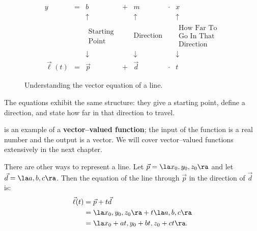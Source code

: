 \begin{figure}[!hb]
\begin{center}
\iflatexml
\[
\begin{array}{ccccccc}
y&=&b&+&m&\cdot&x \\
&&\uparrow&&\uparrow&&\uparrow \\
&&\begin{gathered}\text{Starting}\\[-1ex]\text{Point}\end{gathered}
&&\text{Direction}&&
\begin{gathered}
\text{How Far To}\\[-1ex]\text{Go In That}\\[-1ex]\text{Direction}
\end{gathered} \\
&&\downarrow&&\downarrow&&\downarrow \\
\vec\ell(t)&=&\vec p&+&\vec d&\cdot&t
\end{array}
\]
\else
{}
\fi
\captionsetup{type=figure}%
\caption{Understanding the vector equation of a line.}
\label{fig:lines_eq}
\end{center}
\end{figure}

The equations exhibit the same structure: they give a starting point, define a direction, and state how far in that direction to travel.

 is an example of a \textbf{vector--valued function}; the input of the function is a real number and the output is a vector. We will cover vector--valued functions extensively in the next chapter.

There are other ways to represent a line. Let $\vec p = \la x_0,y_0,z_0\ra$ and let $\vec d = \la a,b,c\ra$. Then the equation of the line through $\vec p$ in the direction of $\vec d$ is:
\begin{align*}
\vec\ell(t) &= \vec p + t\vec d \\
						&= \la x_0,y_0,z_0\ra + t\la a,b,c\ra \\
						&= \la x_0 + at, y_0+bt, z_0+ct\ra.
\end{align*}

